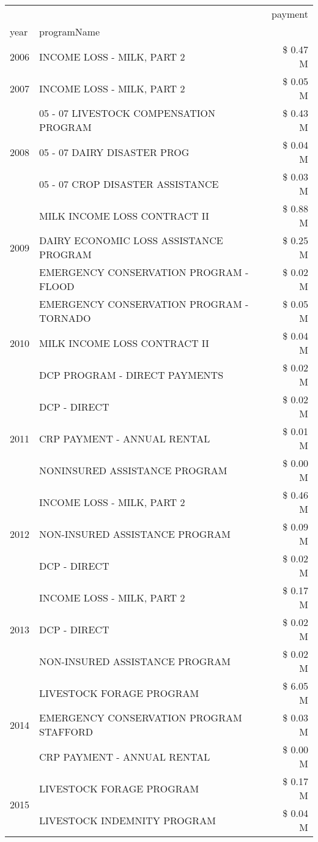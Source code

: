 \begin{tabular}{llr}
\toprule
 &  & payment \\
year & programName &  \\
\midrule
2006 & INCOME LOSS - MILK, PART 2 & \$ 0.47 M \\
\cline{1-3}
2007 & INCOME LOSS - MILK, PART 2 & \$ 0.05 M \\
\cline{1-3}
\multirow[t]{3}{*}{2008} & 05 - 07 LIVESTOCK COMPENSATION PROGRAM & \$ 0.43 M \\
 & 05 - 07 DAIRY DISASTER PROG & \$ 0.04 M \\
 & 05 - 07 CROP DISASTER ASSISTANCE & \$ 0.03 M \\
\cline{1-3}
\multirow[t]{3}{*}{2009} & MILK INCOME LOSS CONTRACT II & \$ 0.88 M \\
 & DAIRY ECONOMIC LOSS ASSISTANCE PROGRAM & \$ 0.25 M \\
 & EMERGENCY CONSERVATION PROGRAM - FLOOD & \$ 0.02 M \\
\cline{1-3}
\multirow[t]{3}{*}{2010} & EMERGENCY CONSERVATION PROGRAM - TORNADO & \$ 0.05 M \\
 & MILK INCOME LOSS CONTRACT II & \$ 0.04 M \\
 & DCP PROGRAM - DIRECT PAYMENTS & \$ 0.02 M \\
\cline{1-3}
\multirow[t]{3}{*}{2011} & DCP - DIRECT & \$ 0.02 M \\
 & CRP PAYMENT - ANNUAL RENTAL & \$ 0.01 M \\
 & NONINSURED ASSISTANCE PROGRAM & \$ 0.00 M \\
\cline{1-3}
\multirow[t]{3}{*}{2012} & INCOME LOSS - MILK, PART 2 & \$ 0.46 M \\
 & NON-INSURED ASSISTANCE PROGRAM & \$ 0.09 M \\
 & DCP - DIRECT & \$ 0.02 M \\
\cline{1-3}
\multirow[t]{3}{*}{2013} & INCOME LOSS - MILK, PART 2 & \$ 0.17 M \\
 & DCP - DIRECT & \$ 0.02 M \\
 & NON-INSURED ASSISTANCE PROGRAM & \$ 0.02 M \\
\cline{1-3}
\multirow[t]{3}{*}{2014} & LIVESTOCK FORAGE PROGRAM & \$ 6.05 M \\
 & EMERGENCY CONSERVATION PROGRAM STAFFORD & \$ 0.03 M \\
 & CRP PAYMENT - ANNUAL RENTAL & \$ 0.00 M \\
\cline{1-3}
\multirow[t]{3}{*}{2015} & LIVESTOCK FORAGE PROGRAM & \$ 0.17 M \\
 & LIVESTOCK INDEMNITY PROGRAM & \$ 0.04 M \\

\end{tabular}
